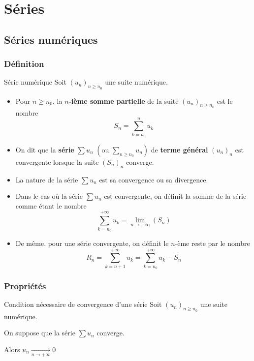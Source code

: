 \chapter{Séries}
\chaptertoc

\section{Séries numériques}

    \subsection{Définition}

    \begin{defi}{Série numérique}{}
        Soit $(u_n)_{n \geq n_0}$ une suite numérique.
        \begin{itemize}
            \item Pour $n \geq n_0$, la \textbf{$n$-ième somme partielle} de la suite $(u_n)_{n \geq n_0}$ est le nombre \[ S_n = \sum\limits_{k=n_0}^n u_k \]
            \item On dit que la \textbf{série} $\sum u_n$ $\left(\text{ou } \sum\limits_{n \geq n_0} u_n \right)$ de \textbf{terme général} $(u_n)_n$ est convergente lorsque la suite $(S_n)_n$ converge.
            \item La nature de la série $\sum u_n$ est sa convergence ou sa divergence.
            \item Dans le cas où la série $\sum u_n$ est convergente, on définit la somme de la série comme étant le nombre \[ \sum\limits_{k = n_0}^{+\infty} u_k = \lim\limits_{n \rightarrow +\infty} (S_n) \]
            \item De même, pour une série convergente, on définit le $n$-ème reste par le nombre 
            \[ R_n = \sum\limits_{k = n+1}^{+\infty} u_k = \sum\limits_{k = n_0}^{+\infty} u_k - S_n \]
        \end{itemize}
    \end{defi}

    \subsection{Propriétés}

    \begin{prop}{Condition nécessaire de convergence d’une série}{}
        Soit $(u_n)_{n \geq n_0}$ une suite numérique.

        On suppose que la série $\sum u_n$ converge.

        Alors $u_n \underset{n \rightarrow +\infty}{\longrightarrow} 0$
    \end{prop}

